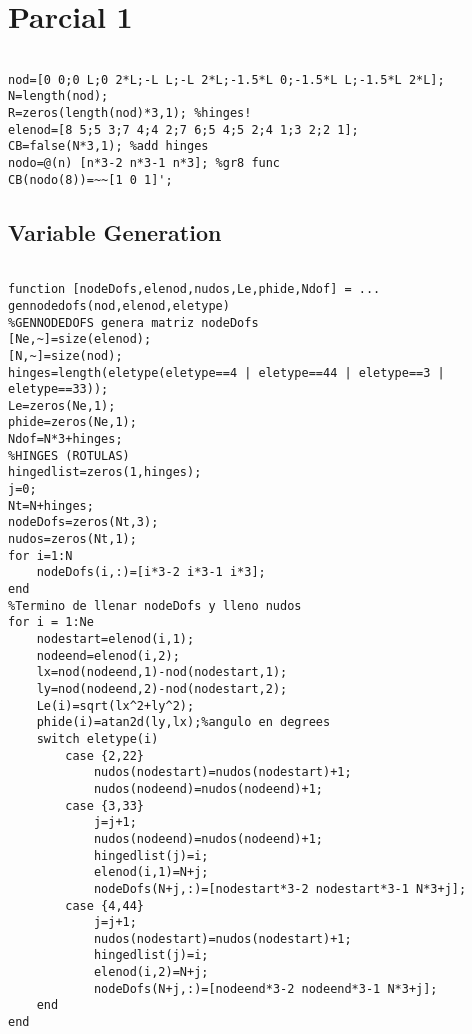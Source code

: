 \bgroup
\section{Parcial 1}

\begin{code}[Inicializar]
\begin{verbatim}

nod=[0 0;0 L;0 2*L;-L L;-L 2*L;-1.5*L 0;-1.5*L L;-1.5*L 2*L];
N=length(nod);
R=zeros(length(nod)*3,1); %hinges! 
elenod=[8 5;5 3;7 4;4 2;7 6;5 4;5 2;4 1;3 2;2 1];
CB=false(N*3,1); %add hinges
nodo=@(n) [n*3-2 n*3-1 n*3]; %gr8 func
CB(nodo(8))=~~[1 0 1]';
\end{verbatim}
\end{code}

\subsection{Variable Generation}

\begin{code}
\begin{verbatim}

function [nodeDofs,elenod,nudos,Le,phide,Ndof] = ...
gennodedofs(nod,elenod,eletype)
%GENNODEDOFS genera matriz nodeDofs
[Ne,~]=size(elenod);
[N,~]=size(nod);
hinges=length(eletype(eletype==4 | eletype==44 | eletype==3 | eletype==33));
Le=zeros(Ne,1);
phide=zeros(Ne,1);
Ndof=N*3+hinges;
%HINGES (ROTULAS)
hingedlist=zeros(1,hinges);
j=0;
Nt=N+hinges;
nodeDofs=zeros(Nt,3);
nudos=zeros(Nt,1);
for i=1:N
    nodeDofs(i,:)=[i*3-2 i*3-1 i*3];
end
%Termino de llenar nodeDofs y lleno nudos
for i = 1:Ne
    nodestart=elenod(i,1);
    nodeend=elenod(i,2);
    lx=nod(nodeend,1)-nod(nodestart,1);
    ly=nod(nodeend,2)-nod(nodestart,2);
    Le(i)=sqrt(lx^2+ly^2);
    phide(i)=atan2d(ly,lx);%angulo en degrees
    switch eletype(i)
        case {2,22}
            nudos(nodestart)=nudos(nodestart)+1;
            nudos(nodeend)=nudos(nodeend)+1;
        case {3,33}
            j=j+1;
            nudos(nodeend)=nudos(nodeend)+1;
            hingedlist(j)=i; 
            elenod(i,1)=N+j;
            nodeDofs(N+j,:)=[nodestart*3-2 nodestart*3-1 N*3+j];
        case {4,44}
            j=j+1;
            nudos(nodestart)=nudos(nodestart)+1;
            hingedlist(j)=i; 
            elenod(i,2)=N+j;
            nodeDofs(N+j,:)=[nodeend*3-2 nodeend*3-1 N*3+j];
    end
end
\end{verbatim}%
\end{code}

